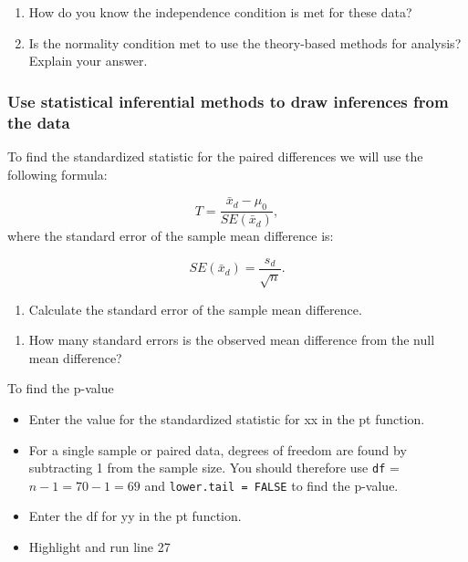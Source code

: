 \documentclass[
]{report}
\providecommand{\tightlist}{%
  \setlength{\itemsep}{0pt}\setlength{\parskip}{0pt}}
\begin{document}
\begin{enumerate}
\def\labelenumi{\arabic{enumi}.}
\setcounter{enumi}{4}
\item
  How do you know the independence condition is met for these data?
  \vspace{0.8in}
\item
  Is the normality condition met to use the theory-based methods for analysis? Explain your answer.
  \vspace{1in}
\end{enumerate}

\subsubsection*{Use statistical inferential methods to draw inferences from the data}\label{use-statistical-inferential-methods-to-draw-inferences-from-the-data-3}

To find the standardized statistic for the paired differences we will use the following formula:

\[T = \frac{\bar{x}_d - \mu_0}{SE(\bar{x}_d)},\]
where the standard error of the sample mean difference is:

\[SE(\bar{x}_d)=\frac{s_d}{\sqrt{n}}.\]

\begin{enumerate}
\def\labelenumi{\arabic{enumi}.}
\setcounter{enumi}{6}
\tightlist
\item
  Calculate the standard error of the sample mean difference.
\end{enumerate}

\vspace{0.5in}

\begin{enumerate}
\def\labelenumi{\arabic{enumi}.}
\setcounter{enumi}{7}
\tightlist
\item
  How many standard errors is the observed mean difference from the null mean difference?
\end{enumerate}

\vspace{0.5in}

To find the p-value

\begin{itemize}
\item
  Enter the value for the standardized statistic for xx in the pt function.
\item
  For a single sample or paired data, degrees of freedom are found by subtracting 1 from the sample size. You should therefore use \texttt{df} = \(n-1 = 70 - 1 = 69\) and \texttt{lower.tail\ =\ FALSE} to find the p-value.
\item
  Enter the df for yy in the pt function.
\item
  Highlight and run line 27
\end{itemize}
\end{document}
